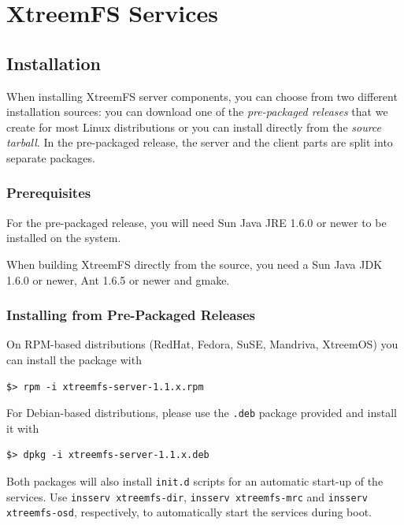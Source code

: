 \documentclass[a4paper,10pt]{book}
\begin{document}
\chapter{XtreemFS Services}

\section{Installation}

When installing XtreemFS server components, you can choose from two different installation sources: you can download one of the \emph{pre-packaged releases} that we create for most Linux distributions or you can install directly from the \emph{source tarball}. In the pre-packaged release, the server and the client parts are split into separate packages.

\subsection{Prerequisites}

For the pre-packaged release, you will need Sun Java JRE 1.6.0 or newer to be installed on the system.

When building XtreemFS directly from the source, you need a Sun Java JDK 1.6.0 or newer, Ant 1.6.5 or newer and gmake.

\subsection{Installing from Pre-Packaged Releases}

On RPM-based distributions (RedHat, Fedora, SuSE, Mandriva, XtreemOS) you can install the package with


\begin{verbatim}
$> rpm -i xtreemfs-server-1.1.x.rpm
\end{verbatim}


For Debian-based distributions, please use the \texttt{.deb} package provided and install it with


\begin{verbatim}
$> dpkg -i xtreemfs-server-1.1.x.deb
\end{verbatim}


Both packages will also install \texttt{init.d} scripts for an automatic start-up of the services. Use \texttt{insserv xtreemfs-dir}, \texttt{insserv xtreemfs-mrc} and \texttt{insserv xtreemfs-osd}, respectively, to automatically start the services during boot.
\end{document}
